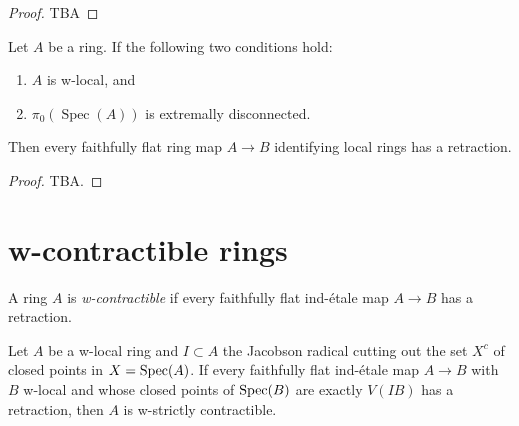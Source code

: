 \begin{proof}
  TBA
\end{proof}

\begin{proposition}
  \label{thm:ff-identifies-local-rings-has-retraction-if}
  Let $A$ be a ring. If the following two conditions hold:
  \begin{enumerate}
    \item $A$ is w-local, and
    \item $\pi_0(\operatorname{Spec}(A))$ is extremally disconnected.
  \end{enumerate}
  Then every faithfully flat ring map $A \to B$ identifying local rings has a retraction.
\end{proposition}

\begin{proof}
  TBA.
\end{proof}

\section{w-contractible rings}

\begin{definition}
A ring \(A\) is \emph{w-contractible} if every faithfully flat ind-étale map \(A \to B\) has a retraction.
  \label{def:w-contractible-ring}
\end{definition}

\begin{lemma}
  \label{thm:w-contractible-if-ind-etale-plus-c-has-retraction}
  Let \(A\) be a w-local ring and $I \subset A$ the Jacobson radical cutting out the set $X^c$ of closed points in $X = \operatorname{Spec} (A)$. If every faithfully flat ind-étale map \(A \to B\) with \(B\) w-local and whose closed points of \(\operatorname{Spec} (B)\) are exactly \(V(IB)\) has a retraction, then \(A\) is w-strictly contractible.
\end{lemma}

